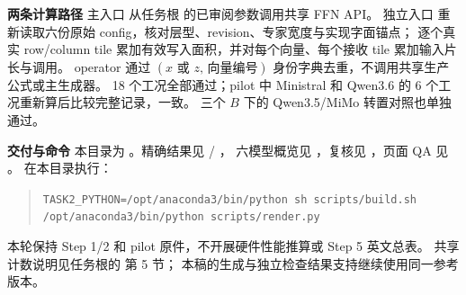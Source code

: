 \documentclass[11pt,a4paper,fontset=fandol]{ctexart}
\newcommand{\para}[1]{\par\smallskip\noindent\textbf{#1}\quad}
\begin{document}
\para{两条计算路径}
主入口  从任务根  的已审阅参数调用共享 FFN API。
独立入口  重新读取六份原始 config，核对层型、revision、专家宽度与实现字面锚点；
逐个真实 row/column tile 累加有效写入面积，并对每个向量、每个接收 tile 累加输入片长与调用。
operator 通过 $(x\text{ 或 }z,\,\text{向量编号})$ 身份字典去重，不调用共享生产公式或主生成器。
18 个工况全部通过；pilot 中 Ministral 和 Qwen3.6 的 6 个工况重新算后比较完整记录，一致。
三个 $B$ 下的 Qwen3.5/MiMo 转置对照也单独通过。

\para{交付与命令}
本目录为 。精确结果见  / ，
六模型概览见 ，复核见 ，页面 QA 见 。
在本目录执行：
\begin{quote}\small
\texttt{TASK2\_PYTHON=/opt/anaconda3/bin/python sh scripts/build.sh}\\
\texttt{/opt/anaconda3/bin/python scripts/render.py}
\end{quote}
\noindent 本轮保持 Step 1/2 和 pilot 原件，不开展硬件性能推算或 Step 5 英文总表。
共享计数说明见任务根的  第 5 节；
本稿的生成与独立检查结果支持继续使用同一参考版本。
\end{document}
